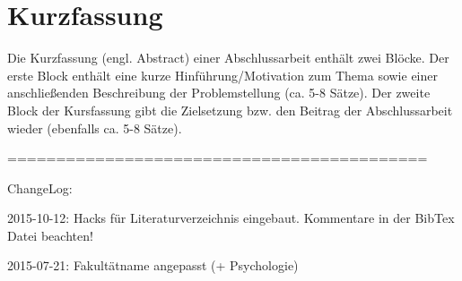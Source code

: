 \section*{Kurzfassung}
Die Kurzfassung (engl. Abstract) einer Abschlussarbeit enthält zwei Blöcke. Der
erste Block enthält eine  kurze Hinführung/Motivation zum Thema sowie einer
anschließenden Beschreibung der Problemstellung (ca. 5-8 Sätze). Der zweite
Block der Kursfassung gibt die Zielsetzung bzw. den Beitrag der Abschlussarbeit
wieder (ebenfalls ca. 5-8 Sätze).

===========================================

ChangeLog:

2015-10-12: Hacks für Literaturverzeichnis eingebaut. Kommentare in der BibTex
Datei beachten!

2015-07-21: Fakultätname angepasst (+ Psychologie)


